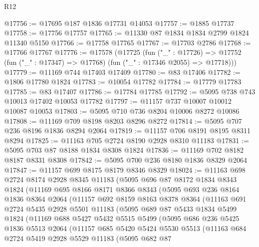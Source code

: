 \begin{lexlean}{R12}
\begin{coremodule}
@17756 := @17695 @187 @1836 @17731 @14053
@17757 := @1885 @17737
@17758 := @17756 @17757
@17765 := @11330 @87 @1834 @1834 @2799 @1824 @11340 @5150
@17766 := @17758 @17765
@17767 := @17703 @2786
@17768 := @17766 @17767
@17776 := @17578
    (@17725
      (fun ("_" : @17726) =>
      @17752 (fun ("_" : @17347) => @17768) (fun ("_" : @17346 @2055) => @17718)))
@17779 := @11169 @744 @17403 @17409
@17780 := @83 @17406
@17782 := @1806 @17780 @1824
@17783 := @10054 @17782
@17784 := @17779 @17783
@17785 := @83 @17407
@17786 := @17784 @17785
@17792 := @5095 @738 @743 @10013 @17402 @10053 @17782
@17797 := @11157 @737 @10007 @10012 @10087 @10053
@17803 := @5095 @710 @736 @8204 @10006 @8272 @10086
@17808 := @11169 @709 @8198 @8203 @8296 @8272
@17814 := @5095 @707 @236 @8196 @1836 @8294 @2064
@17819 := @11157 @706 @8191 @8195 @8311 @8294
@17825 := @11163 @705 @2724 @8190 @2928 @8310 @11183
@17831 := @5095 @703 @87 @8188 @1834 @8308 @1824
@17836 := @11169 @702 @8182 @8187 @8331 @8308
@17842 := @5095 @700 @236 @8180 @1836 @8329 @2064
@17847 := @11157 @699 @8175 @8179 @8346 @8329
@18024 := @11163
    @698
    @2724
    @8174
    @2928
    @8345
    @11183
    (@5095
      @696
      @87
      @8172
      @1834
      @8343
      @1824
      (@11169
        @695
        @8166
        @8171
        @8366
        @8343
        (@5095
          @693
          @236
          @8164
          @1836
          @8364
          @2064
          (@11157
            @692
            @8159
            @8163
            @8378
            @8364
            (@11163
              @691
              @2724
              @5435
              @2928
              @5501
              @11183
              (@5095
                @689
                @87
                @5433
                @1834
                @5499
                @1824
                (@11169
                  @688
                  @5427
                  @5432
                  @5515
                  @5499
                  (@5095
                    @686
                    @236
                    @5425
                    @1836
                    @5513
                    @2064
                    (@11157
                      @685
                      @5420
                      @5424
                      @5530
                      @5513
                      (@11163
                        @684
                        @2724
                        @5419
                        @2928
                        @5529
                        @11183
                        (@5095
                          @682
                          @87

\end{coremodule}
\end{lexlean}
